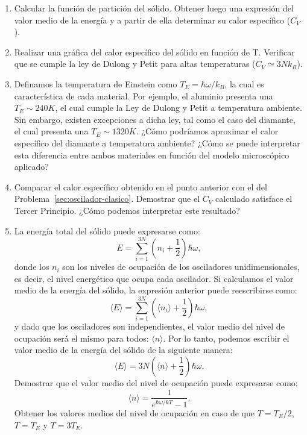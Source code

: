 \documentclass[a4paper,11pt]{article}
\begin{document}
\begin{enumerate}[label=(\alph*),
                  leftmargin=2\parindent,
                  rightmargin=2\parindent]

    \item{Calcular la función de partición del sólido.
          Obtener luego una expresión del valor medio de la energía y a
          partir de ella determinar su calor específico ($C_V$).}

    \item{Realizar una gráfica del calor específico del sólido en
          función de T.
          Verificar que se cumple la ley de Dulong y Petit para altas
          temperaturas ($C_V \simeq 3Nk_B$).}

    \item{Definamos la temperatura de Einstein como
          $T_E = \hbar \omega / k_B $, la cual es característica de
          cada material.
          Por ejemplo, el aluminio presenta una $T_E \sim 240 K$, el cual
          cumple la Ley de Dulong y Petit a temperatura ambiente.
          Sin embargo, existen excepciones a dicha ley, tal como el
          caso del diamante, el cual presenta una $T_E \sim 1320 K$.
          ¿Cómo podríamos aproximar el calor específico del diamante
          a temperatura ambiente?
          ¿Cómo se puede interpretar esta diferencia entre ambos
          materiales en función del modelo microscópico aplicado?
          }

    \item{Comparar el calor específico obtenido en el punto anterior con el del
          Problema~\ref{sec:oscilador-clasico}.
          Demostrar que el $C_V$ calculado satisface el Tercer Principio.
          ¿Cómo podemos interpretar este resultado?}

    \item{La energía total del sólido puede expresarse como:
          $$ E = \sum_{i=1}^{3N} \left( n_i + \frac{1}{2} \right) \hbar \omega, $$
          donde los $n_i$ son los niveles de ocupación de los
          osciladores unidimensionales, es decir, el nivel energético
          que ocupa cada oscilador.
          Si calculamos el valor medio de la energía del sólido, la
          expresión anterior puede reescribirse como:
          $$ \langle E \rangle =
          \sum_{i=1}^{3N}
          \left( \langle n_i \rangle + \frac{1}{2} \right) \hbar \omega, $$
          y dado que los osciladores son independientes, el valor medio
          del nivel de ocupación será el mismo para todos:
          $\langle n \rangle$.
          Por lo tanto, podemos escribir el valor medio de la energía
          del sólido de la siguiente manera:
          $$ \langle E \rangle =
          3N \left( \langle n \rangle + \frac{1}{2} \right) \hbar \omega. $$
          Demostrar que el valor medio del nivel de ocupación puede
          expresarse como:
          $$ \langle n \rangle = \frac{1}{e^{\hbar \omega / kT} - 1}. $$
          Obtener los valores medios del nivel de ocupación en caso de
          que $ T = T_E/2$, $T= T_E$ y $T= 3T_E$.}

\end{enumerate}
\end{document}
